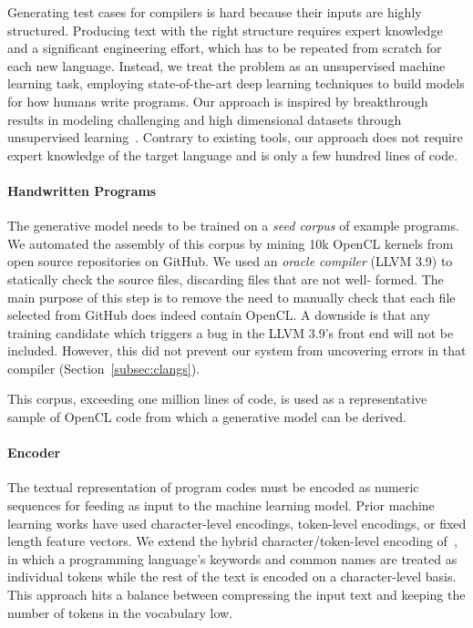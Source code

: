 Generating test cases for compilers is hard because their inputs are highly
structured. Producing text with the right structure requires expert knowledge
and a significant engineering effort, which has to be repeated from scratch for
each new language. Instead, we treat the problem as an unsupervised machine
learning task, employing state-of-the-art deep learning techniques to build
models for how humans write programs. Our approach is inspired by breakthrough
results in modeling challenging and high dimensional datasets through
unsupervised learning~\cite{Raghu2016,Radford2016b,Bowman2015}. Contrary to
existing tools, our approach does not require expert knowledge of the target
language and is only a few hundred lines of code.

\paragraph{Handwritten Programs}

The generative model needs to be trained on a \emph{seed corpus} of example
programs. We automated the assembly of this corpus by mining 10k OpenCL kernels
from open source repositories on GitHub. We used an \emph{oracle compiler} (LLVM
3.9) to statically check the source files, discarding files that are not well-
formed. The main purpose of this step is to remove the need to manually check
that each file selected from GitHub does indeed contain OpenCL. A downside is
that any training candidate which triggers a bug in the LLVM 3.9's front end
will not be included. However, this did not prevent our system from uncovering
errors in that compiler (Section~\ref{subsec:clangs}).

This corpus, exceeding one million lines of code, is used as a representative
sample of OpenCL code from which a generative model can be derived.

\paragraph{Encoder}

The textual representation of program codes must be encoded as numeric sequences
for feeding as input to the machine learning model. Prior machine learning works
have used character-level encodings, token-level encodings, or fixed length
feature vectors. We extend the hybrid character/token-level encoding
of~\cite{Cummins2017b}, in which a programming language's keywords and common
names are treated as individual tokens while the rest of the text is encoded on
a character-level basis. This approach hits a balance between compressing the
input text and keeping the number of tokens in the vocabulary low.

